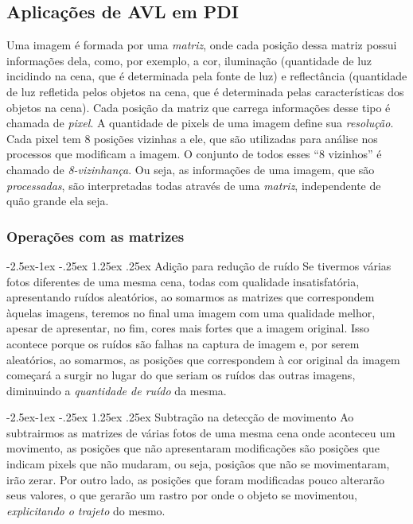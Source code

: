 \documentclass{article}
\makeatletter
\renewcommand\paragraph{\@startsection{paragraph}{4}{\z@}%
            {-2.5ex\@plus -1ex \@minus -.25ex}%
            {1.25ex \@plus .25ex}%
            {\normalfont\normalsize\bfseries}}
\makeatother
\begin{document}
        \subsection {Aplicações de AVL em PDI}
        Uma imagem é formada por uma \textit{matriz}, onde cada posição dessa matriz possui informações dela, como, por exemplo, a cor, iluminação (quantidade de luz incidindo na cena, que é determinada pela fonte de luz)  e reflectância (quantidade de luz refletida pelos objetos na cena, que é determinada pelas características dos objetos na cena). Cada posição da matriz que carrega informações desse tipo é chamada de \textit{pixel}. A quantidade de pixels de uma imagem define sua \textit{resolução}.\\
        Cada pixel tem 8 posições vizinhas a ele, que são utilizadas para análise nos processos que modificam a imagem. O conjunto de todos esses ``8 vizinhos'' é chamado de {\it 8-vizinhança}. Ou seja, as informações de uma imagem, que são {\it processadas}, são interpretadas todas através de uma {\it matriz}, independente de quão grande ela seja.
        
            \subsubsection {Operações com as matrizes}
                
                \paragraph {Adição para redução de ruído}
                    Se tivermos várias fotos diferentes de uma mesma cena, todas com qualidade insatisfatória, apresentando ruídos aleatórios, ao somarmos as matrizes que correspondem àquelas imagens, teremos no final uma imagem com uma qualidade melhor, apesar de apresentar, no fim, cores mais fortes que a imagem original. Isso acontece porque os ruídos são falhas na captura de imagem e, por serem aleatórios, ao somarmos, as posições que correspondem à cor original da imagem começará a surgir no lugar do que seriam os ruídos das outras imagens, diminuindo a {\it quantidade de ruído} da mesma.

                \paragraph{Subtração na detecção de movimento}
                    Ao subtrairmos as matrizes de várias fotos de uma mesma cena onde aconteceu um movimento, as posições que não apresentaram modificações são posições que indicam pixels que não mudaram, ou seja, posiçãos que não se movimentaram, irão zerar. Por outro lado, as posições que foram modificadas pouco alterarão seus valores, o que gerarão um rastro por onde o objeto se movimentou, {\it explicitando o trajeto} do mesmo.
                    
\end{document}
